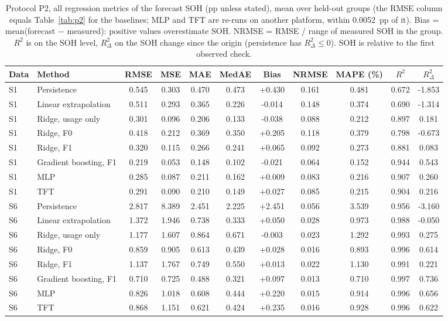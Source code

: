 \begin{table}[t]
  \centering
  \caption{Protocol P2, all regression metrics of the forecast SOH (pp unless stated), mean over held-out groups (the RMSE column equals Table~\ref{tab:p2} for the baselines; MLP and TFT are re-runs on another platform, within 0.0052~pp of it). Bias = mean(forecast $-$ measured): positive values overestimate SOH. NRMSE = RMSE / range of measured SOH in the group. $R^2$ is on the SOH level, $R^2_\Delta$ on the SOH change since the origin (persistence has $R^2_\Delta \le 0$). SOH is relative to the first observed check.}
  \label{tab:d30_regression}
  \setlength{\tabcolsep}{3pt}
  \scriptsize
  \begin{tabular}{llccccccccc}
    \toprule
    Data & Method & RMSE & MSE & MAE & MedAE & Bias & NRMSE & MAPE (\%) & $R^2$ & $R^2_\Delta$ \\
    \midrule
    S1 & Persistence & 0.545 & 0.303 & 0.470 & 0.473 & +0.430 & 0.161 & 0.481 & 0.672 & -1.853 \\
    S1 & Linear extrapolation & 0.511 & 0.293 & 0.365 & 0.226 & -0.014 & 0.148 & 0.374 & 0.690 & -1.314 \\
    S1 & Ridge, usage only & 0.301 & 0.096 & 0.206 & 0.133 & -0.038 & 0.088 & 0.212 & 0.897 & 0.181 \\
    S1 & Ridge, F0 & 0.418 & 0.212 & 0.369 & 0.350 & +0.205 & 0.118 & 0.379 & 0.798 & -0.673 \\
    S1 & Ridge, F1 & 0.320 & 0.115 & 0.266 & 0.241 & +0.065 & 0.092 & 0.273 & 0.881 & 0.083 \\
    S1 & Gradient boosting, F1 & 0.219 & 0.053 & 0.148 & 0.102 & -0.021 & 0.064 & 0.152 & 0.944 & 0.543 \\
    S1 & MLP & 0.285 & 0.087 & 0.211 & 0.162 & +0.009 & 0.083 & 0.216 & 0.907 & 0.260 \\
    S1 & TFT & 0.291 & 0.090 & 0.210 & 0.149 & +0.027 & 0.085 & 0.215 & 0.904 & 0.216 \\
    \midrule
    S6 & Persistence & 2.817 & 8.389 & 2.451 & 2.225 & +2.451 & 0.056 & 3.539 & 0.956 & -3.160 \\
    S6 & Linear extrapolation & 1.372 & 1.946 & 0.738 & 0.333 & +0.050 & 0.028 & 0.973 & 0.988 & -0.050 \\
    S6 & Ridge, usage only & 1.177 & 1.607 & 0.864 & 0.671 & -0.003 & 0.023 & 1.292 & 0.993 & 0.275 \\
    S6 & Ridge, F0 & 0.859 & 0.905 & 0.613 & 0.439 & +0.028 & 0.016 & 0.893 & 0.996 & 0.614 \\
    S6 & Ridge, F1 & 1.137 & 1.767 & 0.749 & 0.550 & +0.013 & 0.022 & 1.130 & 0.991 & 0.221 \\
    S6 & Gradient boosting, F1 & 0.710 & 0.725 & 0.488 & 0.321 & +0.097 & 0.013 & 0.710 & 0.997 & 0.736 \\
    S6 & MLP & 0.826 & 1.018 & 0.608 & 0.444 & +0.220 & 0.015 & 0.914 & 0.996 & 0.656 \\
    S6 & TFT & 0.868 & 1.151 & 0.621 & 0.424 & +0.235 & 0.016 & 0.928 & 0.996 & 0.622 \\
    \bottomrule
  \end{tabular}
\end{table}
